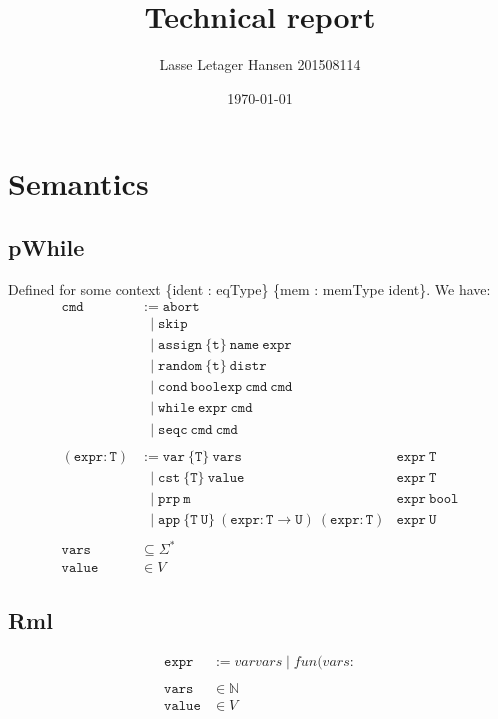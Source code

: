 \documentclass[11pt, leqno]{article}
\author{Lasse Letager Hansen 201508114}
\date{\today}
\title{Technical report}
\newcommand{\set}[1]{\{#1\}}
\begin{document}
\maketitle

\section{Semantics}
\subsection{pWhile}
Defined for some context \set{ident : eqType} \set{mem : memType ident}. We have:
\begin{align*}
  \mathtt{cmd} &:= \mathtt{abort} \\
               &~~\mid \mathtt{skip} \\
               &~~\mid \mathtt{assign~\set{t}~name~expr} \\
               &~~\mid \mathtt{random~\set{t}~distr} \\
               &~~\mid \mathtt{cond~boolexp~cmd~cmd} \\
               &~~\mid \mathtt{while~expr~cmd} \\
               &~~\mid \mathtt{seqc~cmd~cmd}
  \\ \\
  \mathtt{(expr : T)} &:= \mathtt{var~\set{T}~vars} & \mathtt{expr~T} \\
               &~~\mid \mathtt{cst~\set{T}~value} & \mathtt{expr~T} \\
               &~~\mid \mathtt{prp~m} & \mathtt{expr~bool} \\
               &~~\mid \mathtt{app~\set{T~U}~(expr : T \rightarrow U)~(expr : T)} & \mathtt{expr~U}
  \\ \\
  \mathtt{vars} &\subseteq \Sigma^* \\
  \mathtt{value} &\in V
\end{align*}

\subsection{Rml}
\begin{align*}
  \mathtt{expr} &:= var vars \mid fun (vars : 
  \\ \\
  \mathtt{vars} &\in \mathbb{N} \\
  \mathtt{value} &\in V
\end{align*}
\end{document}
